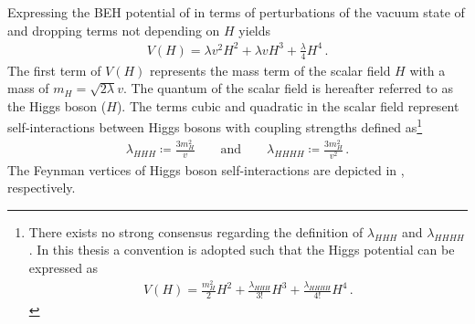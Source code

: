 Expressing the BEH potential of  in terms of
perturbations of the vacuum state of  and dropping
terms not depending on $H$ yields
\begin{align}
  V(H) =
  \lambda v^2 H^2
  + \lambda v H^3
  + \frac{\lambda}{4} H^4 \,\text{.}
  \label{eq:beh_potential}
\end{align}
The first term of $V(H)$ represents the mass term of the scalar field $H$ with a
mass of $m_H = \sqrt{2\lambda} v$. The quantum of the scalar field is hereafter
referred to as the Higgs boson ($H$). The terms cubic and quadratic in the
scalar field represent self-interactions between Higgs bosons with coupling
strengths defined as\footnote{There exists no strong consensus regarding the
  definition of $\lambda_{HHH}$ and $\lambda_{HHHH}$. In this thesis a
  convention is adopted such that the Higgs potential can be expressed as
  \begin{align*}
    V(H) = \frac{m_{H}^2}{2} H^2 + \frac{\lambda_{HHH}}{3!} H^3 + \frac{\lambda_{HHHH}}{4!}
    H^4 \,\text{.}
  \end{align*}
}
\begin{align*}
  \lambda_{HHH} \coloneqq \frac{3 m_{H}^2}{v} \qquad \text{and} \qquad \lambda_{HHHH} \coloneqq \frac{3 m_{H}^2}{v^2} \,\text{.}
\end{align*}
The Feynman vertices of Higgs boson self-interactions are depicted in
, respectively.

